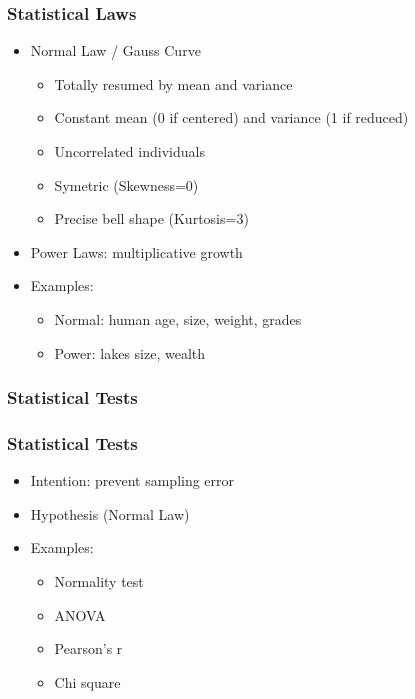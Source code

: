 \begin{frame}\frametitle{Statistical Laws}
   \begin{itemize}
      \item Normal Law / Gauss Curve
      \begin{itemize}
         \item Totally resumed by mean and variance
         \item Constant mean (0 if centered) and variance (1 if reduced)
         \item Uncorrelated individuals
         \item Symetric (Skewness=0)
         \item Precise bell shape (Kurtosis=3)
      \end{itemize}

      \item Power Laws: multiplicative growth
      \item Examples:
      \begin{itemize}
         \item Normal: human age, size, weight, grades
         \item Power: lakes size, wealth
      \end{itemize}
   \end{itemize}
\end{frame}


\subsubsection{Statistical Tests}

\begin{frame}\frametitle{Statistical Tests}
   \begin{itemize}
      \item Intention: prevent sampling error
      \item Hypothesis (Normal Law)
      \item Examples:
      \begin{itemize}
         \item Normality test
         \item ANOVA
         \item Pearson's r
         \item Chi square
      \end{itemize}
   \end{itemize}
\end{frame}



